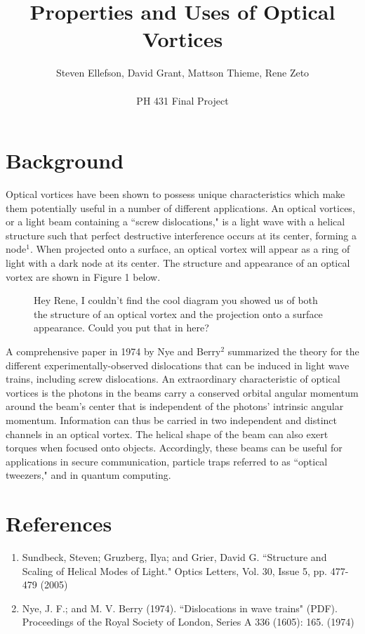\documentclass{article}
\begin{document}
\chead{}
\title{Properties and Uses of Optical Vortices}
\author{Steven Ellefson, David Grant, Mattson Thieme, Rene Zeto\\\\PH 431 Final Project}
\maketitle

\section*{Background}
Optical vortices have been shown to possess unique characteristics which make them potentially useful in a number of different applications. An optical vortices, or a light beam containing a ``screw dislocations," is a light wave with a helical structure such that perfect destructive interference occurs at its center, forming a node$^{1}$. When projected onto a surface, an optical vortex will appear as a ring of light with a dark node at its center. The structure and appearance of an optical vortex are shown in Figure 1 below.

\begin{figure}[hc]
		\centering
			\caption{Hey Rene, I couldn't find the cool diagram you showed us of both the structure of an optical vortex and the projection onto a surface appearance. Could you put that in here? }
		\end{figure}
		
A comprehensive paper in 1974 by Nye and Berry$^{2}$ summarized the theory for the different experimentally-observed dislocations that can be induced in light wave trains, including screw dislocations. An extraordinary characteristic of optical vortices is the photons in the beams carry a conserved orbital angular momentum around the beam's center that is independent of the photons' intrinsic angular momentum. Information can thus be carried in two independent and distinct channels in an optical vortex. The helical shape of the beam can also exert torques when focused onto objects. Accordingly, these beams can be useful for applications in secure communication, particle traps referred to as ``optical tweezers," and in quantum computing.

\section*{References}
\begin{enumerate}
	\item{Sundbeck, Steven; Gruzberg, Ilya; and Grier, David G. ``Structure and Scaling of  Helical Modes of Light." Optics Letters, Vol. 30, Issue 5, pp. 477-479 (2005)}
	\item{Nye, J. F.; and M. V. Berry (1974). ``Dislocations in wave trains" (PDF). Proceedings of the Royal Society of London, Series A 336 (1605): 165. (1974)}
\end{enumerate}
\end{document}
